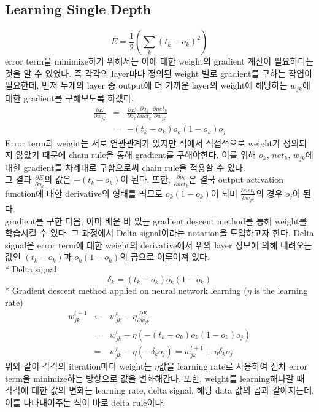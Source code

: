 \documentclass[draft=false]{oblivoir}
\begin{document}
\subsection{Learning Single Depth}
\begin{equation}
E = \frac{1}{2}(\sum_{k}(t_{k}-o_{k})^{2})
\end{equation}
error term을 minimize하기 위해서는 이에 대한 weight의 gradient 계산이 필요하다는 것을 알 수 있었다. 즉 각각의 layer마다 정의된 weight 별로 gradient를 구하는 작업이 필요한데, 먼저 두개의 layer 중 output에 더 가까운 layer의 weight에 해당하는 $w_{jk}$에 대한 gradient를 구해보도록 하겠다. 
\begin{eqnarray}
\frac{\partial E}{\partial w_{jk}} & = &  \frac{\partial E}{\partial o_{k}}\frac{\partial o_{k} }{\partial net_{k}}\frac{\partial net_{k} }{\partial w_{jk}}\\ 
& = & -(t_{k}-o_{k})o_{k}(1-o_{k})o_{j}
\end{eqnarray}
Error term과 weight는 서로 연관관계가 있지만 식에서 직접적으로 weight가 정의되지 않았기 때문에 chain rule을 통해 gradient를 구해야한다. 이를 위해 $o_{k}$, $net_{k}$, $w_{jk}$에 대한 gradient를 차례대로 구함으로써 chain rule을 적용할 수 있다. \\
그 결과 $\frac{\partial E}{\partial o_{k}}$의 값은  $-(t_{k}-o_{k})$이 된다. 또한, $\frac{\partial o_{k}}{\partial net_{k}}$은 결국 output activation function에 대한 derivative의 형태를 띄므로  $o_{k}(1-o_{k})$이 되며 $\frac{\partial net_{k} }{\partial w_{jk}}$의 경우 $o_{j}$이 된다.\\
gradient를 구한 다음, 이미 배운 바 있는 gradient descent method를 통해 weight를 학습시킬 수 있다. 그 과정에서 Delta signal이라는 notation을 도입하고자 한다. Delta signal은 error term에 대한 weight의 derivative에서 위의 layer 정보에 의해 내려오는 값인 $(t_{k}-o_{k})$과 $o_{k}(1-o_{k})$의 곱으로 이루어져 있다. \\

* Delta signal 
\begin{equation}
\delta_{k} = (t_{k}-o_{k})o_{k}(1-o_{k})
\end{equation}
* Gradient descent method applied on neural network learning ($\eta$ is the learning rate)
\begin{eqnarray}
w^{t+1}_{jk} & \leftarrow &  w^{t}_{jk} - \eta\frac{\partial E}{\partial w_{jk}}\\
& = & w^{t}_{jk} - \eta(-(t_{k}-o_{k})o_{k}(1-o_{k})o_{j})\\
& = & w^{t}_{jk} - \eta(-\delta_{k}o_{j}) = w^{t+1}_{jk} + \eta\delta_{k}o_{j}
\end{eqnarray}
위와 같이 각각의 iteration마다 weight는 $\eta$값을 learning rate로 사용하여 점차 error term을 minimize하는 방향으로 값을 변화해간다. 또한, weight를 learning해나갈 때 각각에 대한 값의 변화는 learning rate, delta signal, 해당 data 값의 곱과 같아지는데, 이를 나타내어주는 식이 바로 delta rule이다.\\
\end{document}
